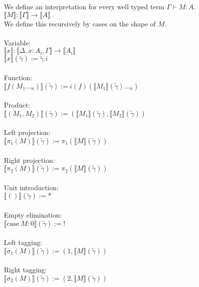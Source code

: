 \documentclass[12pt]{article}
\begin{document}
We define an interpretation for every well typed term $\Gamma \vdash M : A$. \\
$\llbracket M \rrbracket : \llbracket \Gamma \rrbracket \rightarrow \llbracket A \rrbracket$\\
We define this recursively by cases on the shape of $M$.\\\\
Variable:\\
$\llbracket x \rrbracket : \llbracket \Delta, x : A_i, \Gamma \rrbracket \rightarrow \llbracket A_i \rrbracket$ \\
$\llbracket x \rrbracket(\tilde{\gamma}) := \tilde{\gamma}.i$\\\\
Function:\\
$\llbracket f(M_1 ..._n) \rrbracket(\tilde{\gamma}) := i(f)(\llbracket M_1 \rrbracket (\tilde{\gamma}) ..._n)$\\\\
Product:\\
$\llbracket (M_1, M_2) \rrbracket(\tilde{\gamma}) := (\llbracket M_1 \rrbracket (\tilde{\gamma}), \llbracket M_2 \rrbracket (\tilde{\gamma}))$ \\\\
Left projection:\\
$\llbracket \pi_1(M) \rrbracket(\tilde{\gamma}) := \pi_1(\llbracket M\rrbracket (\tilde{\gamma}))$ \\\\
Right projection:\\
$\llbracket \pi_2(M) \rrbracket(\tilde{\gamma}) := \pi_2(\llbracket M\rrbracket (\tilde{\gamma}))$\\\\
Unit introduction:\\
$\llbracket () \rrbracket(\tilde{\gamma}) := *$\\\\
Empty elimination:\\
$\llbracket \text{case} \; M : 0 \rrbracket(\tilde{\gamma}) := !$\\\\
Left tagging:\\
$\llbracket \sigma_1(M) \rrbracket(\tilde{\gamma}) := (1, \llbracket M\rrbracket (\tilde{\gamma}))$ \\\\
Right tagging:\\
$\llbracket \sigma_2(M) \rrbracket(\tilde{\gamma}) := (2, \llbracket M\rrbracket (\tilde{\gamma}))$\\\\
\end{document}

